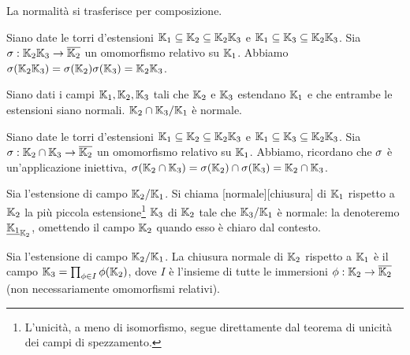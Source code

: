 \begin{Theorem}
	La normalit\`a si trasferisce per composizione.
\end{Theorem}
\Proof Siano date le torri d'estensioni $\mathbb{K}_1 \subseteq \mathbb{K}_2 \subseteq \mathbb{K}_2\mathbb{K}_3$ e $\mathbb{K}_1 \subseteq \mathbb{K}_3 \subseteq \mathbb{K}_2\mathbb{K}_3$. Sia $\sigma: \mathbb{K}_2\mathbb{K}_3 \rightarrow \overline{\mathbb{K}_2}$ un omomorfismo relativo su $\mathbb{K}_1$. Abbiamo $\sigma(\mathbb{K}_2\mathbb{K}_3) = \sigma(\mathbb{K}_2)\sigma(\mathbb{K}_3) = \mathbb{K}_2\mathbb{K}_3$. \EndProof
\begin{Theorem}
	Siano dati i campi $\mathbb{K}_1, \mathbb{K}_2, \mathbb{K}_3$ tali che $\mathbb{K}_2$ e $\mathbb{K}_3$ estendano $\mathbb{K}_1$ e che entrambe le estensioni siano normali. $\mathbb{K}_2 \cap \mathbb{K}_3/\mathbb{K}_1$ \`e normale.
\end{Theorem}
\Proof Siano date le torri d'estensioni $\mathbb{K}_1 \subseteq \mathbb{K}_2 \subseteq \mathbb{K}_2\mathbb{K}_3$ e $\mathbb{K}_1 \subseteq \mathbb{K}_3 \subseteq \mathbb{K}_2\mathbb{K}_3$. Sia $\sigma: \mathbb{K}_2 \cap \mathbb{K}_3 \rightarrow \overline{\mathbb{K}_2}$ un omomorfismo relativo su $\mathbb{K}_1$. Abbiamo, ricordano che $\sigma$ \`e un'applicazione iniettiva, $\sigma(\mathbb{K}_2 \cap \mathbb{K}_3) = \sigma(\mathbb{K}_2) \cap \sigma(\mathbb{K}_3) = \mathbb{K}_2 \cap \mathbb{K}_3$. \EndProof
\begin{Definition}
	Sia l'estensione di campo $\mathbb{K}_2/\mathbb{K}_1$. Si chiama [normale][chiusura] di $\mathbb{K}_1$ rispetto a $\mathbb{K}_2$ la pi\`u piccola estensione\footnote{L'unicit\`a, a meno di isomorfismo, segue direttamente dal teorema di unicit\`a dei campi di spezzamento.} $\mathbb{K}_3$ di $\mathbb{K}_2$ tale che $\mathbb{K}_3/\mathbb{K}_1$ \`e normale: la denoteremo $\NormalClosure{\Field_1}[\Field_2]$, omettendo il campo $\mathbb{K}_2$ quando esso \`e chiaro dal contesto.
\end{Definition}
\begin{Theorem}
	Sia l'estensione di campo $\mathbb{K}_2/\mathbb{K}_1$. La chiusura normale di $\mathbb{K}_2$ rispetto a $\mathbb{K}_1$ \`e il campo $\mathbb{K}_3 = \prod_{\phi \in I} \phi(\mathbb{K}_2)$, dove $I$ \`e l'insieme di tutte le immersioni $\phi: \mathbb{K}_2 \rightarrow \overline{\mathbb{K}_2}$ (non necessariamente omomorfismi relativi).
\end{Theorem}
